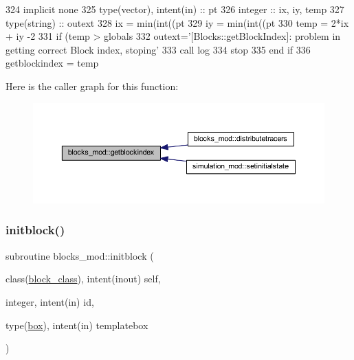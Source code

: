 \begin{DoxyCode}
324     \textcolor{keywordtype}{implicit none}
325     \textcolor{keywordtype}{type}(vector), \textcolor{keywordtype}{intent(in)} :: pt
326     \textcolor{keywordtype}{integer} :: ix, iy, temp
327     \textcolor{keywordtype}{type}(string) :: outext
328     ix = min(int((pt%
329     iy = min(int((pt%
330     temp = 2*ix + iy -2
331     \textcolor{keywordflow}{if} (temp > globals%
332         outext=\textcolor{stringliteral}{'[Blocks::getBlockIndex]: problem in getting correct Block index, stoping'}
333         \textcolor{keyword}{call }log%
334         stop
335 \textcolor{keywordflow}{    end if}
336     getblockindex = temp
\end{DoxyCode}
Here is the caller graph for this function\+:
\nopagebreak
\begin{figure}[H]
\begin{center}
\leavevmode
\includegraphics[width=350pt]{namespaceblocks__mod_a62e8fb0d6b2535b4499c7a4d848c24ba_icgraph}
\end{center}
\end{figure}
\mbox{\label{namespaceblocks__mod_a534ca69b17b6f54ee07f995b02feff39}} 
\subsubsection{\texorpdfstring{initblock()}{initblock()}}
{\footnotesize\ttfamily subroutine blocks\+\_\+mod\+::initblock (\begin{DoxyParamCaption}\item[{class(\mbox{\hyperlink{structblocks__mod_1_1block__class}{block\+\_\+class}}), intent(inout)}]{self,  }\item[{integer, intent(in)}]{id,  }\item[{type(\mbox{\hyperlink{structgeometry__mod_1_1box}{box}}), intent(in)}]{templatebox }\end{DoxyParamCaption})\hspace{0.3cm}{\ttfamily [private]}}



